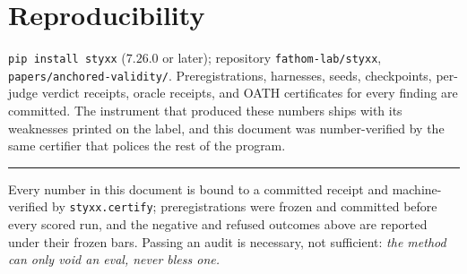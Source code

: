 \documentclass[11pt]{article}
\begin{document}
\section{Reproducibility}

\texttt{pip install styxx} ($7.26.0$ or later); repository \texttt{fathom-lab/styxx},
\texttt{papers/anchored-validity/}. Preregistrations, harnesses, seeds, checkpoints, per-judge verdict
receipts, oracle receipts, and OATH certificates for every finding are committed. The instrument that
produced these numbers ships with its weaknesses printed on the label, and this document was
number-verified by the same certifier that polices the rest of the program.

\vspace{1em}
\hrule
\vspace{0.5em}
{\small\noindent Every number in this document is bound to a committed receipt and machine-verified by
\texttt{styxx.certify}; preregistrations were frozen and committed before every scored run, and the
negative and refused outcomes above are reported under their frozen bars. Passing an audit is
necessary, not sufficient: \emph{the method can only void an eval, never bless one.}}
\end{document}
